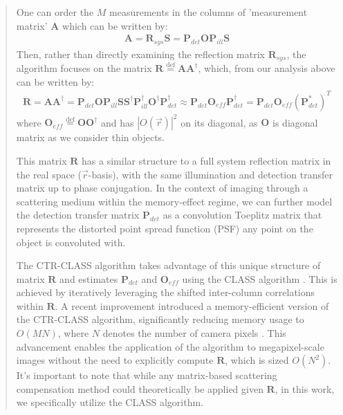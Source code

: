 \documentclass[12pt]{article}
\newenvironment{ourresponse}
    {\begin{tcolorbox}[width=\linewidth,breakable,enhanced,colback=gray!5,colframe=responsecolor!50,title=Response,left=5pt,right=5pt]}
    {\end{tcolorbox}}
\begin{document}
\begin{enumerate}[label=\arabic*.]
\begin{ourresponse}
\begin{quote}
            
            One can order the $M$ measurements in the columns of 'measurement matrix' $\bm{A}$ which can be written by:
            \begin{eqnarray}
            \bm{A} = \bm{R}_{sys}\bm{S} = \bm{P}_{det}\bm{O}\bm{P}_{ill}\bm{S}
            \label{eq:3}
            \end{eqnarray}
            Then, rather than directly examining the reflection matrix $\bm{R}_{sys}$, the algorithm focuses on the matrix $\bm{R} \stackrel{\text{def}} = \bm{A}\bm{A}^\dagger$, which, from our analysis above can be written by:
            \begin{eqnarray}
            \bm{R}=\bm{A}\bm{A}^\dagger = \bm{P}_{det}\bm{O}\bm{P}_{ill}\bm{S} \bm{S}^\dagger\bm{P}_{ill}^\dagger \bm{O}^\dagger \bm{P}^\dagger_{det} \approx \bm{P}_{det}\bm{O}_{eff} \bm{P}^\dagger_{det} = \bm{P}_{det}\bm{O}_{eff} (\bm{P}^{*}_{det})^T
            \label{eq:4}
            \end{eqnarray}
            where $\bm{O}_{eff} \stackrel{\text{def}} = \bm{O}\bm{O}^\dagger$ and has $|{O}(\vec{r})|^2$ on its diagonal, as $\bm{O}$ is diagonal matrix as we consider thin objects.
            
            This matrix $\bm{R}$ has a similar structure to a full system reflection matrix in the real space ($\vec{r}$-basis), with the same illumination and detection transfer matrix up to phase conjugation.
            In the context of imaging through a scattering medium within the memory-effect regime, we can further model the detection transfer matrix $ \bm{P}_{det}$ as a convolution Toeplitz matrix that represents the distorted point spread function (PSF) any point on the object is convoluted with.
            
            The CTR-CLASS algorithm takes advantage of this unique structure of matrix $\bm{R}$ and estimates $\bm{P}_{det}$ and $\bm{O}_{eff}$ using the CLASS algorithm \cite{kang17}. This is achieved by iteratively leveraging the shifted inter-column correlations within $\bm{R}$.
            A recent improvement introduced a memory-efficient version of the CTR-CLASS algorithm, significantly reducing memory usage to $O(MN)$, where $N$ denotes the number of camera pixels \cite{weinberg2023noninvasive}. This advancement enables the application of the algorithm to megapixel-scale images without the need to explicitly compute $\bm{R}$, which is sized $O(N^2)$.
            It's important to note that while any matrix-based scattering compensation method could theoretically be applied given $\bm{R}$, in this work, we specifically utilize the CLASS algorithm.
            

\end{quote}
\end{ourresponse}
\end{enumerate}
\end{document}
